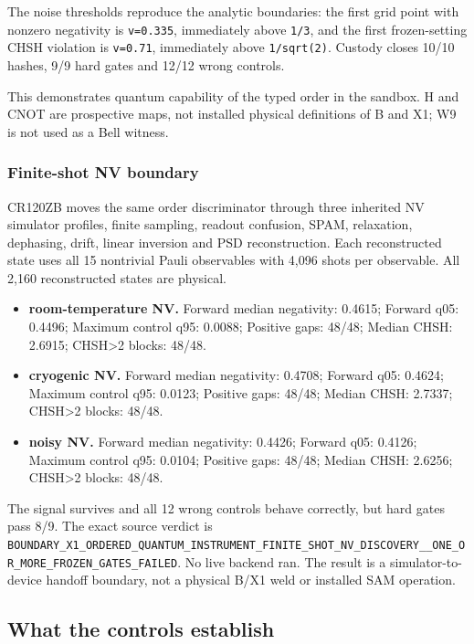 The noise thresholds reproduce the analytic boundaries: the first grid
point with nonzero negativity is \texttt{v=0.335}, immediately above
\texttt{1/3}, and the first frozen-setting CHSH violation is
\texttt{v=0.71}, immediately above \texttt{1/sqrt(2)}. Custody closes
10/10 hashes, 9/9 hard gates and 12/12 wrong controls.

This demonstrates quantum capability of the typed order in the sandbox.
H and CNOT are prospective maps, not installed physical definitions of B
and X1; W9 is not used as a Bell witness.

\subsubsection{Finite-shot NV boundary}\label{viii-ch05-finite-shot-nv-boundary}

CR120ZB moves the same order discriminator through three inherited NV
simulator profiles, finite sampling, readout confusion, SPAM,
relaxation, dephasing, drift, linear inversion and PSD reconstruction.
Each reconstructed state uses all 15 nontrivial Pauli observables with
4,096 shots per observable. All 2,160 reconstructed states are physical.

\begin{itemize}
\tightlist
\item
  \textbf{room-temperature NV.} Forward median negativity: 0.4615;
  Forward q05: 0.4496; Maximum control q95: 0.0088; Positive gaps:
  48/48; Median CHSH: 2.6915; CHSH\textgreater2 blocks: 48/48.
\item
  \textbf{cryogenic NV.} Forward median negativity: 0.4708; Forward q05:
  0.4624; Maximum control q95: 0.0123; Positive gaps: 48/48; Median
  CHSH: 2.7337; CHSH\textgreater2 blocks: 48/48.
\item
  \textbf{noisy NV.} Forward median negativity: 0.4426; Forward q05:
  0.4126; Maximum control q95: 0.0104; Positive gaps: 48/48; Median
  CHSH: 2.6256; CHSH\textgreater2 blocks: 48/48.
\end{itemize}

The signal survives and all 12 wrong controls behave correctly, but hard
gates pass 8/9. The exact source verdict is
\nolinkurl{BOUNDARY_X1_ORDERED_QUANTUM_INSTRUMENT_FINITE_SHOT_NV_DISCOVERY__ONE_OR_MORE_FROZEN_GATES_FAILED}.
No live backend ran. The result is a simulator-to-device handoff
boundary, not a physical B/X1 weld or installed SAM operation.

\subsection{What the controls
establish}\label{viii-ch05-what-the-controls-establish}


